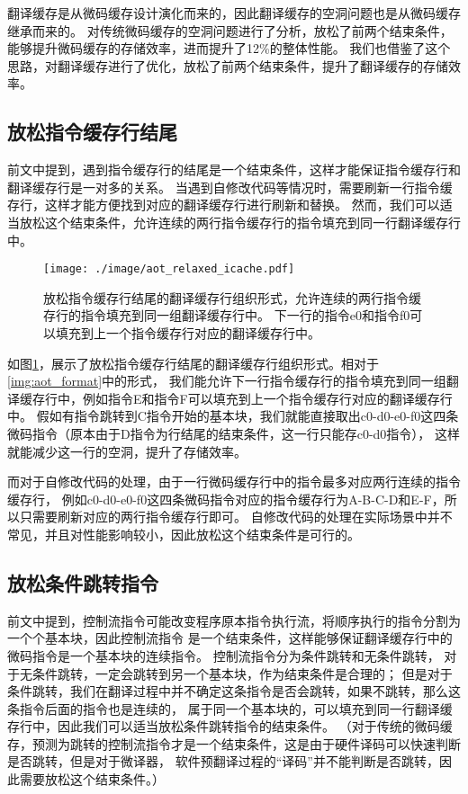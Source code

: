 翻译缓存是从微码缓存设计演化而来的，因此翻译缓存的空洞问题也是从微码缓存继承而来的。
\cite{kotraImprovingUtilizationMicrooperation2020}
对传统微码缓存的空洞问题进行了分析，放松了前两个结束条件，能够提升微码缓存的存储效率，进而提升了12\%的整体性能。
我们也借鉴了这个思路，对翻译缓存进行了优化，放松了前两个结束条件，提升了翻译缓存的存储效率。

\subsection{放松指令缓存行结尾}

前文中提到，遇到指令缓存行的结尾是一个结束条件，这样才能保证指令缓存行和翻译缓存行是一对多的关系。
当遇到自修改代码等情况时，需要刷新一行指令缓存行，这样才能方便找到对应的翻译缓存行进行刷新和替换。
然而，我们可以适当放松这个结束条件，允许连续的两行指令缓存行的指令填充到同一行翻译缓存行中。

\begin{figure}[!htbp]
    \centering
    \texttt{[image: ./image/aot\_relaxed\_icache.pdf]}
    \caption{放松指令缓存行结尾的翻译缓存行组织形式，允许连续的两行指令缓存行的指令填充到同一组翻译缓存行中。
    下一行的指令e0和指令f0可以填充到上一个指令缓存行对应的翻译缓存行中。
    }
    \label{img:aot_relaxed_icache}
  \end{figure}

如图\ref{img:aot_relaxed_icache}，展示了放松指令缓存行结尾的翻译缓存行组织形式。相对于\ref{img:aot_format}中的形式，
我们能允许下一行指令缓存行的指令填充到同一组翻译缓存行中，例如指令E和指令F可以填充到上一个指令缓存行对应的翻译缓存行中。
假如有指令跳转到C指令开始的基本块，我们就能直接取出c0-d0-e0-f0这四条微码指令（原本由于D指令为行结尾的结束条件，这一行只能存c0-d0指令），
这样就能减少这一行的空洞，提升了存储效率。

而对于自修改代码的处理，由于一行微码缓存行中的指令最多对应两行连续的指令缓存行，
例如c0-d0-e0-f0这四条微码指令对应的指令缓存行为A-B-C-D和E-F，所以只需要刷新对应的两行指令缓存行即可。
自修改代码的处理在实际场景中并不常见，并且对性能影响较小，因此放松这个结束条件是可行的。

\subsection{放松条件跳转指令}

前文中提到，控制流指令可能改变程序原本指令执行流，将顺序执行的指令分割为一个个基本块，因此控制流指令
是一个结束条件，这样能够保证翻译缓存行中的微码指令是一个基本块的连续指令。
控制流指令分为条件跳转和无条件跳转，
对于无条件跳转，一定会跳转到另一个基本块，作为结束条件是合理的；
但是对于条件跳转，我们在翻译过程中并不确定这条指令是否会跳转，如果不跳转，那么这条指令后面的指令也是连续的，
属于同一个基本块的，可以填充到同一行翻译缓存行中，因此我们可以适当放松条件跳转指令的结束条件。
（对于传统的微码缓存，预测为跳转的控制流指令才是一个结束条件，这是由于硬件译码可以快速判断是否跳转，但是对于微译器，
软件预翻译过程的“译码”并不能判断是否跳转，因此需要放松这个结束条件。）

